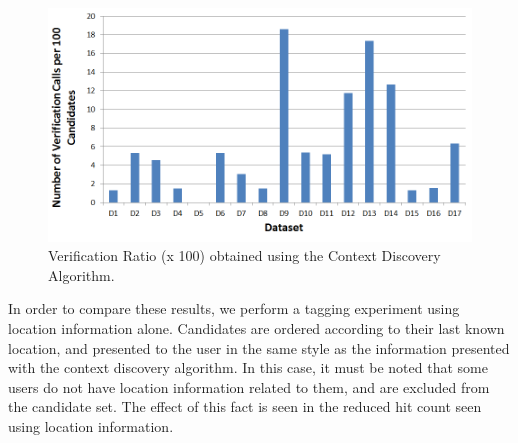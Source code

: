 \begin{figure}[t]
\centering
\includegraphics[width=\textwidth]{media/chapter5/axis/cx-verification-ratio-all-datasets.png}
\caption{Verification Ratio (x 100) obtained using the Context Discovery Algorithm.}
\label{fig:exp-cx-verification-ratio}
\end{figure}

In order to compare these results, we perform a tagging experiment using location information alone. Candidates are ordered according to their last known location, and presented to the user in the same style as the information presented with the context discovery algorithm. In this case, it must be noted that some users do not have location information related to them, and are excluded from the candidate set. The effect of this fact is seen in the reduced hit count seen using location information.


